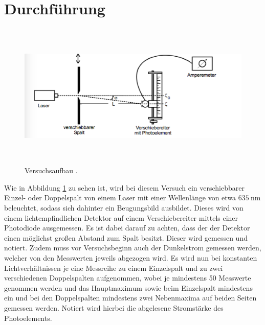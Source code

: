 \section{Durchführung}
\label{sec:Durchführung}
\begin{figure}[H]
  \centering
  \includegraphics[height=7cm]{Aufbau.png}
  \caption{Versuchsaufbau \cite{skript}.}
  \label{fig:aufbau}
\end{figure}
Wie in Abbildung \ref{fig:aufbau} zu sehen ist, wird bei diesem Versuch ein
verschiebbarer Einzel- oder Doppelspalt von einem Laser mit einer Wellenlänge von
etwa $\SI{635}{\nano\meter} $ beleuchtet, sodass sich dahinter ein Beugungsbild
ausbildet. Dieses wird von einem lichtempfindlichen Detektor auf einem
Verschiebereiter mittels einer Photodiode ausgemessen.
Es ist dabei darauf zu achten, dass der der Detektor einen
möglichst großen Abstand zum Spalt besitzt. Dieser wird gemessen
und notiert.
Zudem muss vor Versuchsbeginn auch der Dunkelstrom gemessen werden, welcher
von den Messwerten jeweils abgezogen wird.
Es wird nun bei konstanten Lichtverhältnissen je eine Messreihe zu einem Einzelspalt
und zu zwei verschiedenen Doppelspalten aufgenommen, wobei je mindestens 50
Messwerte genommen werden und das Hauptmaximum sowie beim Einzelspalt mindestens ein
und bei den Doppelspalten mindestens zwei Nebenmaxima auf beiden Seiten gemessen werden.
Notiert wird hierbei die abgelesene Stromstärke des Photoelements.

